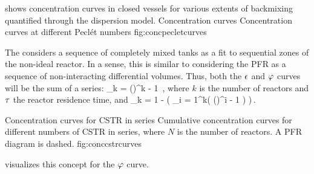 shows concentration curves in closed vessels for various extents of backmixing quantified through the dispersion model.
%
   {Concentration curves}
   {Concentration curves at different Peclét numbers}%
   {fig:concpecletcurves}%

The  considers a sequence of completely mixed tanks as a fit to sequential zones of the non-ideal reactor. In a sense, this is similar to considering the PFR as a sequence of non-interacting differential volumes. Thus, both the $\epsilon$ and $\varphi$ curves will be the sum of a series:
\beq
\eadist_{k} = \left(\right)^{k - 1}
              \,,
\eeq
where $k$ is the number of reactors and $\tau$ the reactor residence time, and
\beq
\crtfrac_{k} = 1 - \left(
                   \exp{}\sum_{i = 1}^{k}\left(
                                                       \left(\right)^{i - 1}
                                                       \right)
                   \right)\,.
\eeq

%
   {Concentration curves for CSTR in series}
   {Cumulative concentration curves for different numbers of CSTR in series, where $N$ is the number of reactors. A PFR diagram is dashed.}%
   {fig:conccstrcurves}%

 visualizes this concept for the $\varphi$ curve.
